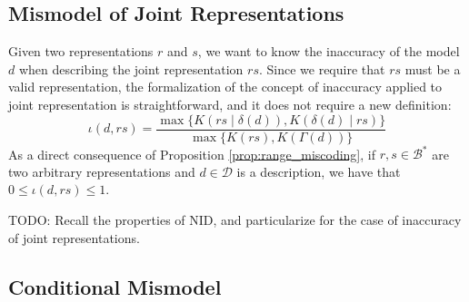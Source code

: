 %
%

\subsection{Mismodel of Joint Representations}

{\color{red}

Given two representations $r$ and $s$, we want to know the inaccuracy of the model $d$ when describing the joint representation $rs$. Since we require that $rs$ must be a valid representation, the formalization of the concept of inaccuracy applied to joint representation is straightforward, and it does not require a new definition:
\[
\iota(d, rs) = \frac{ \max\{ K \left(rs \mid \delta(d) \right), K \left( \delta(d) \mid rs \right) \} } { \max\{ K(rs), K \left(\Gamma(d) \right) \} }
\]
As a direct consequence of Proposition \ref{prop:range_miscoding}, if $r, s \in \mathcal{B}^\ast$ are two arbitrary representations and $d \in \mathcal{D}$ is a description, we have that $0 \leq \iota(d, rs) \leq 1$.

{\color{red} TODO: Recall the properties of NID, and particularize for the case of inaccuracy of joint representations.}

}

%
%

\subsection{Conditional Mismodel}

